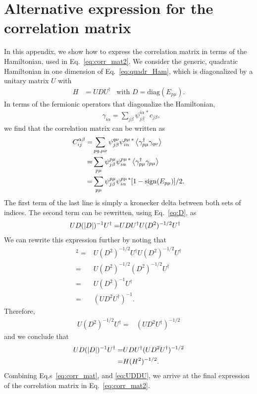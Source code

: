 \documentclass[twocolumn,amsmath,longbibliography,amssymb,superscriptaddress]{revtex4-1}
\begin{document}
\section{Alternative expression for the correlation matrix}\label{app:CM}
In this appendix, we show how to express the correlation matrix in terms of the Hamiltonian, used in Eq.~\eqref{eq:corr_mat2}. 
We consider the generic, quadratic Hamiltonian in one dimension of Eq.~\eqref{eq:quadr_Ham}, which is diagonalized by a unitary matrix $U$ with 
	\begin{align}\label{eq:D}
	H&=UDU^\dagger& \mbox{with } D=\mbox{diag}(E_{p\mu}).
	\end{align} 
In terms of the fermionic operators that diagonalize the Hamiltonian, 
\begin{align}
& \gamma_{i\alpha} = \sum_{j\beta}\psi_{j\beta}^{i\alpha \, \ast} c_{j\beta},
\end{align}
we find that the correlation matrix can be written as 
\begin{align}\label{eq:corr_mat}
C_{ij}^{\alpha \beta} =& \sum_{pq,\mu\nu} \psi^{q\nu }_{j\beta} \psi^{p\mu \, \ast}_{i\alpha} \expval{\gamma^\dagger_{p\mu} \gamma_{q\nu} }\nonumber \\
=&  \sum_{p\mu} \psi^{p\mu }_{j\beta} \psi^{p\mu \, \ast}_{i\alpha} \expval{\gamma^\dagger_{p\mu} \gamma_{p\mu} }\nonumber \\
=&  \sum_{p\mu} \psi^{p\mu }_{j\beta} \psi^{p\mu \, \ast}_{i\alpha} [1-{\rm sign}(E_{p\mu})]/2.
\end{align}
The first term of the last line is simply a kronecker delta between both sets of indices. The second term can be rewritten, using Eq.~\eqref{eq:D}, as
\begin{align}
UD(\abs{D})^{-1}U^\dagger =& UDU^\dagger U(D^2)^{-1/2}U^\dagger
\end{align}
We can rewrite this expression further by noting that 
\begin{align}
[U (D^2)^{-1/2} U^\dagger]^2 =& U (D^2)^{-1/2} U^\dagger U  (D^2)^{-1/2} U^\dagger \nonumber\\
=&  U (D^2)^{-1/2}  (D^2)^{-1/2} U^\dagger \nonumber\\
=&  U (D^2)^{-1} U^\dagger \nonumber\\
=&  (U D^2 U^\dagger)^{-1}.
\end{align}
Therefore,
\begin{align}
U (D^2)^{-1/2} U^\dagger =&(U D^2 U^\dagger)^{-1/2} 
\end{align}
and we conclude that
\begin{align}\label{eq:UDDU}
UD(\abs{D})^{-1}U^\dagger =& UDU^\dagger(U D^2 U^\dagger)^{-1/2} \nonumber\\ 
=& H(H^2)^{-1/2}.
\end{align}
Combining Eq.s~\eqref{eq:corr_mat},  and \eqref{eq:UDDU}, we arrive at the final expression of the correlation matrix in Eq.~\eqref{eq:corr_mat2}. 
\end{document}
